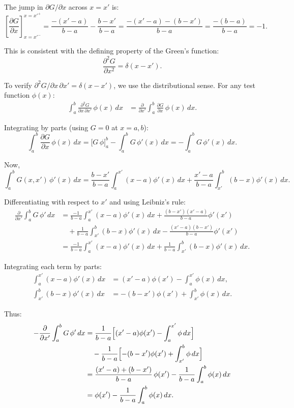 \documentclass[12pt]{article}
\begin{document}
The jump in $\partial G/\partial x$ across $x = x'$ is:
\[
\left[\frac{\partial G}{\partial x}\right]_{x=x'^-}^{x=x'^+} = \frac{-(x'-a)}{b-a} - \frac{b-x'}{b-a} = \frac{-(x'-a) - (b-x')}{b-a} = \frac{-(b-a)}{b-a} = -1.
\]

This is consistent with the defining property of the Green's function:
\[
\frac{\partial^2 G}{\partial x^2} = \delta(x - x').
\]

To verify $\partial^2 G/\partial x\,\partial x' = \delta(x-x')$, we use the distributional sense. For any test function $\phi(x)$:
\begin{align}
\int_a^b \frac{\partial^2 G}{\partial x\,\partial x'}\,\phi(x)\,dx &= \frac{\partial}{\partial x'}\int_a^b \frac{\partial G}{\partial x}\,\phi(x)\,dx.
\end{align}

Integrating by parts (using $G=0$ at $x=a,b$):
\[
\int_a^b \frac{\partial G}{\partial x}\,\phi(x)\,dx = \bigl[G\,\phi\bigr]_a^b - \int_a^b G\,\phi'(x)\,dx = -\int_a^b G\,\phi'(x)\,dx.
\]

Now,
\[
\int_a^b G(x,x')\,\phi'(x)\,dx = \frac{b-x'}{b-a}\int_a^{x'}(x-a)\phi'(x)\,dx + \frac{x'-a}{b-a}\int_{x'}^{b}(b-x)\phi'(x)\,dx.
\]

Differentiating with respect to $x'$ and using Leibniz's rule:
\begin{align}
\frac{\partial}{\partial x'}\int_a^b G\,\phi'\,dx &= \frac{-1}{b-a}\int_a^{x'}(x-a)\phi'(x)\,dx + \frac{(b-x')(x'-a)}{b-a}\phi'(x') \\
&\quad + \frac{1}{b-a}\int_{x'}^b(b-x)\phi'(x)\,dx - \frac{(x'-a)(b-x')}{b-a}\phi'(x') \\
&= \frac{-1}{b-a}\int_a^{x'}(x-a)\phi'(x)\,dx + \frac{1}{b-a}\int_{x'}^b(b-x)\phi'(x)\,dx.
\end{align}

Integrating each term by parts:
\begin{align}
\int_a^{x'}(x-a)\phi'(x)\,dx &= (x'-a)\phi(x') - \int_a^{x'}\phi(x)\,dx, \\
\int_{x'}^b(b-x)\phi'(x)\,dx &= -(b-x')\phi(x') + \int_{x'}^b\phi(x)\,dx.
\end{align}

Thus:
\begin{align}
-\frac{\partial}{\partial x'}\int_a^b G\,\phi'\,dx &= \frac{1}{b-a}\Bigl[(x'-a)\phi(x') - \int_a^{x'}\phi\,dx\Bigr] \\
&\quad - \frac{1}{b-a}\Bigl[-(b-x')\phi(x') + \int_{x'}^b\phi\,dx\Bigr] \\
&= \frac{(x'-a)+(b-x')}{b-a}\,\phi(x') - \frac{1}{b-a}\int_a^b \phi(x)\,dx \\
&= \phi(x') - \frac{1}{b-a}\int_a^b\phi(x)\,dx.
\end{align}
\end{document}
